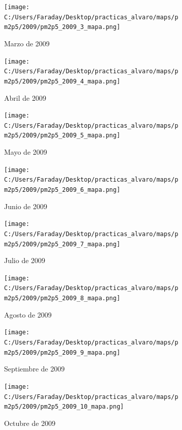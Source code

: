 \documentclass[12pt]{article}
\begin{document}
\begin{figure}[H]
\centering
\begin{subfigure}[h]{0.45\textwidth}
\texttt{[image: C:/Users/Faraday/Desktop/practicas\_alvaro/maps/pm2p5/2009/pm2p5\_2009\_3\_mapa.png]}
\caption{Marzo de 2009}
\label{fig:map-mon-4-3-2009}
\end{subfigure}
%
\begin{subfigure}[H]{0.45\textwidth}
\texttt{[image: C:/Users/Faraday/Desktop/practicas\_alvaro/maps/pm2p5/2009/pm2p5\_2009\_4\_mapa.png]}
\caption{Abril de 2009}
\label{fig:map-mon-4-4-2009}
\end{subfigure}
\caption{}
\end{figure}

\begin{figure}[H]
\centering
\begin{subfigure}[h]{0.45\textwidth}
\texttt{[image: C:/Users/Faraday/Desktop/practicas\_alvaro/maps/pm2p5/2009/pm2p5\_2009\_5\_mapa.png]}
\caption{Mayo de 2009}
\label{fig:map-mon-4-5-2009}
\end{subfigure}
%
\begin{subfigure}[H]{0.45\textwidth}
\texttt{[image: C:/Users/Faraday/Desktop/practicas\_alvaro/maps/pm2p5/2009/pm2p5\_2009\_6\_mapa.png]}
\caption{Junio de 2009}
\label{fig:map-mon-4-6-2009}
\end{subfigure}
\caption{}
\end{figure}

\newpage

\begin{figure}[H]
\centering
\begin{subfigure}[h]{0.45\textwidth}
\texttt{[image: C:/Users/Faraday/Desktop/practicas\_alvaro/maps/pm2p5/2009/pm2p5\_2009\_7\_mapa.png]}
\caption{Julio de 2009}
\label{fig:map-mon-4-7-2009}
\end{subfigure}
%
\begin{subfigure}[H]{0.45\textwidth}
\texttt{[image: C:/Users/Faraday/Desktop/practicas\_alvaro/maps/pm2p5/2009/pm2p5\_2009\_8\_mapa.png]}
\caption{Agosto de 2009}
\label{fig:map-mon-4-8-2009}
\end{subfigure}
\caption{}
\end{figure}

\begin{figure}[H]
\centering
\begin{subfigure}[h]{0.45\textwidth}
\texttt{[image: C:/Users/Faraday/Desktop/practicas\_alvaro/maps/pm2p5/2009/pm2p5\_2009\_9\_mapa.png]}
\caption{Septiembre de 2009}
\label{fig:map-mon-4-9-2009}
\end{subfigure}
%
\begin{subfigure}[H]{0.45\textwidth}
\texttt{[image: C:/Users/Faraday/Desktop/practicas\_alvaro/maps/pm2p5/2009/pm2p5\_2009\_10\_mapa.png]}
\caption{Octubre de 2009}
\label{fig:map-mon-4-10-2009}
\end{subfigure}
\caption{}
\end{figure}
\end{document}
